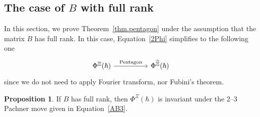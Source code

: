 \documentclass[12pt,reqno]{amsart}
\theoremstyle{definition}
\newtheorem{proposition}[theorem]{Proposition}
\def\be{\begin{equation}}
\def\ee{\end{equation}}
\renewcommand{\=}{\;=\;}
\begin{document}
\subsection{\texorpdfstring{The case of $B$ with full rank}{The case of B with full rank}}
\label{sub.case0}

In this section, we prove Theorem~\ref{thm.pentagon} under the assumption that
the matrix $B$ has full rank. In this case, Equation~\eqref{2Phi} simplifies
to the following one
\be
\label{2Phi.0}
\begin{tikzcd}
\Phi^\Xi(\hbar)\arrow[rr,"\text{Pentagon}"] & & \Phi^{\widetilde\Xi}(\hbar)
\end{tikzcd}
\ee
since we do not need to apply Fourier transform, nor Fubini's theorem.

\begin{proposition}
\label{prop.case0}
If $B$ has full rank, then $\Phi^{\Xi}(\hbar)$ is invariant under the 2--3
Pachner move given in Equation~\eqref{AB3}.
\end{proposition}
\end{document}
